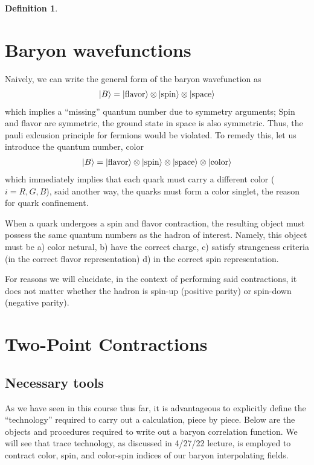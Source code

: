 \documentclass[prd,12pt,superscriptaddress,tightenlines,nofootinbib]{revtex4}
\theoremstyle{plain}
\theoremstyle{definition}
\newtheorem{defn}[thm]{Definition}
\theoremstyle{remark}
\begin{document}
\begin{defn}
\section{Baryon wavefunctions} \label{III}
Naively, we can write the general form of the baryon wavefunction as
\begin{align}
	\ket{B} = \ket{\text{flavor}} \otimes \ket{\text{spin}} \otimes \ket{\text{space}}
\end{align} which implies a ``missing'' quantum number due to symmetry arguments; Spin and flavor are symmetric, the ground state 
in space is also symmetric. Thus, the pauli exlcusion principle for fermions would be violated. To remedy this, let us introduce 
the quantum number, color
\begin{align}
	\ket{B} = \ket{\text{flavor}} \otimes \ket{\text{spin}} \otimes \ket{\text{space}} \otimes \ket{\text{color}}
\end{align} 
which immediately implies that each quark must carry a different color ($i = R,G,B$), said another way, the quarks must form a color singlet, 
the reason for quark confinement. 

When a quark undergoes a spin and flavor contraction, the resulting object must possess the same quantum numbers 
as the hadron of interest. Namely, this object must be a) color netural, b) have the correct charge, c) satisfy 
strangeness criteria (in the correct flavor representation) d) in the correct spin representation.

For reasons we will elucidate, in the context of performing said contractions, it does not matter whether
the hadron is spin-up (positive parity) or spin-down (negative parity). 

\section{Two-Point Contractions}
\subsection*{Necessary tools}
As we have seen in this course thus far, it is advantageous to explicitly define the ``technology'' 
required to carry out a calculation, piece by piece. Below are the objects and procedures required to 
write out a baryon correlation function. We will see that trace technology, as discussed in 4/27/22 lecture,
is employed to contract color, spin, and color-spin indices of our baryon interpolating fields.




\end{defn}
\end{document}
